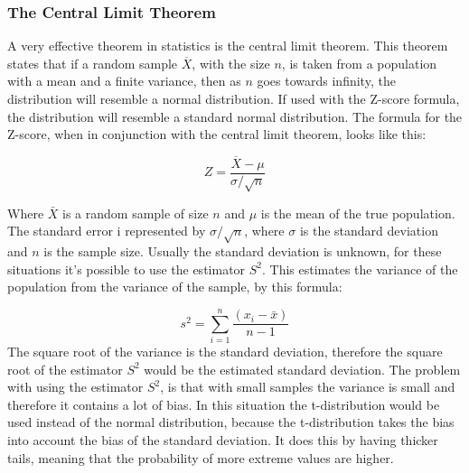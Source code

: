 \subsubsection{The Central Limit Theorem}
A very effective theorem in statistics is the central limit theorem. This theorem states that if a random sample $\overline{X}$, with the size $n$, is taken from a population with a mean and a finite variance, then as $n$ goes towards infinity, the distribution will resemble a normal distribution. If used with the Z-score formula, the distribution will resemble a standard normal distribution. The formula for the Z-score, when in conjunction with the central limit theorem, looks like this:

\begin{equation}
Z=\frac{\overline{X}-\mu}{\sigma/\sqrt{n}}
\end{equation}


\noindent Where $\bar{X}$ is a random sample of size $n$ and $\mu$ is the mean of the true population. The standard error i represented by $\sigma/\sqrt{n}$, where $\sigma$ is the standard deviation and $n$ is the sample size.
Usually the standard deviation is unknown, for these situations it's possible to use the estimator $S^2$. This estimates the variance of the population from the variance of the sample, by this formula:

\begin{equation}
s^2=\sum_{i=1}^{n}\frac{(x_{i}-\bar{x})}{n-1}
\end{equation}
The square root of the variance is the standard deviation, therefore the square root of the estimator $S^2$ would be the estimated standard deviation. The problem with using the estimator $S^2$, is that with small samples the variance is small and therefore it contains a lot of bias. In this situation the t-distribution would be used instead of the normal distribution, because the t-distribution takes the bias into account the bias of the standard deviation. It does this by having thicker tails, meaning that the probability of more extreme values are higher.

